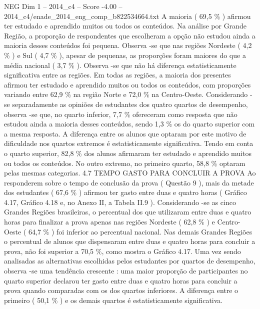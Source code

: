 \begin{textsample}{NEG Dim 1 – 2014\_c4 – Score -4.00 – 2014\_c4/enade\_2014\_eng\_comp\_b822534664.txt}
A maioria ( 69,5 \% ) afirmou ter estudado e aprendido muitos ou todos os conteúdos.
Na análise por Grande Região, a proporção de respondentes que escolheram a opção não estudou ainda a maioria desses conteúdos foi pequena.
Observa -se que nas regiões Nordeste ( 4,2 \% ) e Sul ( 4,7 \% ), apesar de pequenas, as proporções foram maiores do que a média nacional ( 3,7 \% ).
Observa -se que não há diferença estatisticamente significativa entre as regiões.
Em todas as regiões, a maioria dos presentes afirmou ter estudado e aprendido muitos ou todos os conteúdos, com proporções variando entre 62,9 \% na região Norte e 72,0 \% na Centro-Oeste.
Considerando -se separadamente as opiniões de estudantes dos quatro quartos de desempenho, observa -se que, no quarto inferior, 7,7 \% ofereceram como resposta que não estudou ainda a maioria desses conteúdos, sendo 1,3 \% os do quarto superior com a mesma resposta.
A diferença entre os alunos que optaram por este motivo de dificuldade nos quartos extremos é estatisticamente significativa.
Tendo em conta o quarto superior, 82,8 \% dos alunos afirmaram ter estudado e aprendido muitos ou todos os conteúdos.
No outro extremo, no primeiro quarto, 58,8 \% optaram pelas mesmas categorias. 4.7 TEMPO GASTO PARA CONCLUIR A PROVA Ao responderem sobre o tempo de conclusão da prova ( Questão 9 ), mais da metade dos estudantes ( 67,6 \% ) afirmou ter gasto entre duas e quatro horas ( Gráfico 4.17, Gráfico 4.18 e, no Anexo II, a Tabela II.9 ).
Considerando -se as cinco Grandes Regiões brasileiras, o percentual dos que utilizaram entre duas e quatro horas para finalizar a prova apenas nas regiões Nordeste ( 62,8 \% ) e Centro-Oeste ( 64,7 \% ) foi inferior ao percentual nacional.
Nas demais Grandes Regiões o percentual de alunos que dispensaram entre duas e quatro horas para concluir a prova, não foi superior a 70,5 \%, como mostra o Gráfico 4.17.
Uma vez sendo analisadas as alternativas escolhidas pelos estudantes por quartos de desempenho, observa -se uma tendência crescente : uma maior proporção de participantes no quarto superior declarou ter gasto entre duas e quatro horas para concluir a prova quando comparadas com os dos quartos inferiores.
A diferença entre o primeiro ( 50,1 \% ) e os demais quartos é estatisticamente significativa.

\end{textsample}
